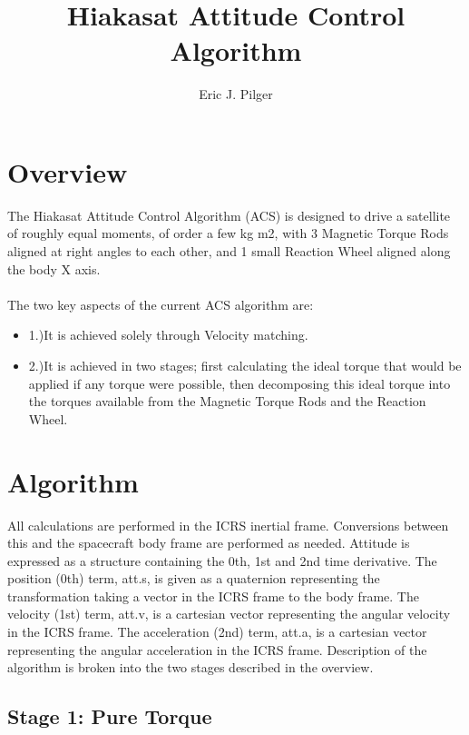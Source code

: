 \documentclass[12pt,letterpaper]{report}
\title{Hiakasat Attitude Control Algorithm}
\author{Eric J. Pilger}
\begin{document}
\maketitle
\tableofcontents

\section{Overview}

The Hiakasat Attitude Control Algorithm (ACS) is designed to drive a satellite of roughly equal moments, of order a few kg m2, with 3 Magnetic Torque Rods aligned at right angles to each other, and 1 small Reaction Wheel aligned along the body X axis.
\\
\\
The two key aspects of the current ACS algorithm are:
\begin{itemize}
\item 1.)It is achieved solely through Velocity matching.
\item 2.)It is achieved in two stages; first calculating the ideal torque that would be applied if any torque were possible, then decomposing this ideal torque into the torques available from the Magnetic Torque Rods and the Reaction Wheel. 
\end{itemize}

\section{Algorithm}

All calculations are performed in the ICRS inertial frame. Conversions between this and the spacecraft body frame are performed as needed. Attitude is expressed as a structure containing the 0th, 1st and 2nd time derivative. The position (0th) term, att.s, is given as a quaternion representing the transformation taking a vector in the ICRS frame to the body frame. The velocity (1st) term, att.v, is a cartesian vector representing the angular velocity in the ICRS frame. The acceleration (2nd) term, att.a, is a cartesian vector representing the angular acceleration in the ICRS frame. Description of the algorithm is broken into the two stages described in the overview.

\subsection{Stage 1: Pure Torque}
\end{document}
